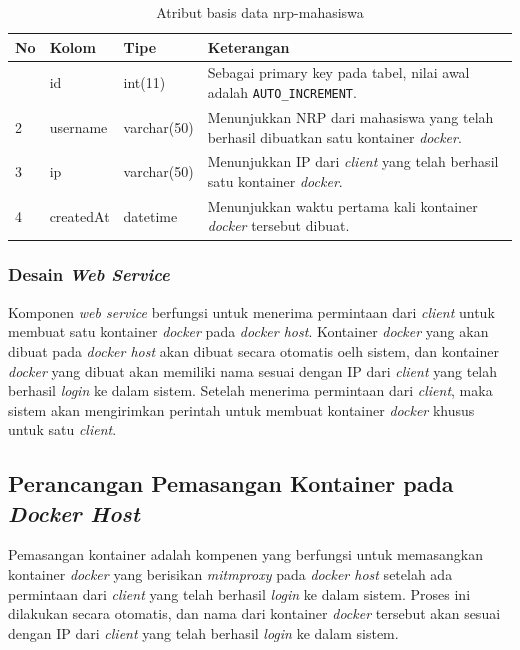 	\begin{longtable}{|p{}|p{}|p{}|p{}|}
		\caption{Atribut basis data nrp-mahasiswa} \label{tabelkontainer} \\
		\hline
		\textbf{No} & \textbf{Kolom} & \textbf{Tipe} & \textbf{Keterangan} \\ \hline
		\endhead
		\endfoot
		\endlastfoot
		1 & id & int(11) & Sebagai primary key pada tabel, nilai awal adalah \texttt{AUTO\_INCREMENT}. \\ \hline
		2 & username & varchar(50) & Menunjukkan NRP dari mahasiswa yang telah berhasil dibuatkan satu kontainer \textit{docker}. \\ \hline
		3 & ip & varchar(50) & Menunjukkan IP dari \textit{client} yang telah berhasil satu kontainer \textit{docker}. \\ \hline
		4 & createdAt & datetime & Menunjukkan waktu pertama kali kontainer \textit{docker} tersebut dibuat. \\ \hline
		
	\end{longtable}
	
	
	\subsubsection{Desain \textit{Web Service}}
	Komponen \textit{web service} berfungsi untuk menerima permintaan dari \textit{client} untuk membuat satu kontainer \textit{docker} pada \textit{docker host}. Kontainer \textit{docker} yang akan dibuat pada \textit{docker host} akan dibuat secara otomatis oelh sistem, dan kontainer \textit{docker} yang dibuat akan memiliki nama sesuai dengan IP dari \textit{client} yang telah berhasil \textit{login} ke dalam sistem. Setelah menerima permintaan dari \textit{client}, maka sistem akan mengirimkan perintah untuk membuat kontainer \textit{docker} khusus untuk satu \textit{client}. 
   	
    \subsection{Perancangan Pemasangan Kontainer pada \textit{Docker Host}}
	Pemasangan kontainer adalah kompenen yang berfungsi untuk memasangkan kontainer \textit{docker} yang berisikan \textit{mitmproxy} pada \textit{docker host} setelah ada permintaan dari \textit{client} yang telah berhasil \textit{login} ke dalam sistem. Proses ini dilakukan secara otomatis, dan nama dari kontainer \textit{docker} tersebut akan sesuai dengan IP dari \textit{client} yang telah berhasil \textit{login} ke dalam sistem.
	
